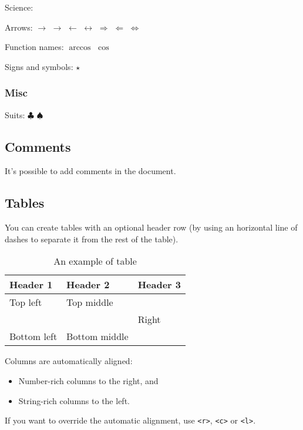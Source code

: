 \documentclass[11pt]{article}
\begin{document}
Science: \textpm{} \textdiv{}

Arrows: \(\to\) \(\rightarrow\) \(\leftarrow\) \(\leftrightarrow\) \(\Rightarrow\) \(\Leftarrow\) \(\Leftrightarrow\)

Function names: \(\arccos\) \(\cos\)

Signs and symbols: \textbullet{} \(\star\)

\subsubsection*{Misc}
\label{sec:org84a8986}

Suits: \(\clubsuit\) \(\spadesuit\)

\subsection*{Comments}
\label{sec:org9bbbd39}

It's possible to add comments in the document.

\subsection*{Tables}
\label{sec:org24f38e9}

You can create tables with an optional header row (by using an horizontal line
of dashes to separate it from the rest of the table).

\begin{table}[htbp]
\caption{An example of table}
\centering
\begin{tabular}{lll}
Header 1 & Header 2 & Header 3\\[0pt]
\hline
Top left & Top middle & \\[0pt]
 &  & Right\\[0pt]
Bottom left & Bottom middle & \\[0pt]
\end{tabular}
\end{table}

Columns are automatically aligned:

\begin{itemize}
\item Number-rich columns to the right, and
\item String-rich columns to the left.
\end{itemize}

If you want to override the automatic alignment, use \texttt{<r>}, \texttt{<c>} or \texttt{<l>}.
\end{document}
